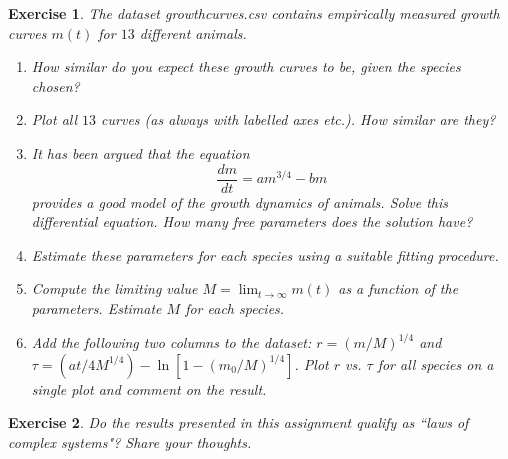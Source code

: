 \documentclass[english, 11pt]{article}
\newtheorem{Ex}{Exercise}
\begin{document}
\begin{Ex}
		The dataset growth\textunderscore curves.csv contains empirically measured growth curves $m(t)$ for $13$ different animals.
		\begin{enumerate}
			\item How similar do you expect these growth curves to be, given the species chosen?
			\item Plot all $13$ curves (as always with labelled axes etc.). How similar are they?
			\item It has been argued that the equation $$\frac{dm}{dt}=am^{3/4}-bm$$ provides a good model of the growth dynamics of animals. Solve this differential equation. How many free parameters does the solution have?
			\item Estimate these parameters for each species using a suitable fitting procedure. 
			\item Compute the limiting value $M=\lim_{t\to\infty}m(t)$ as a function of the  parameters. Estimate $M$ for each species. 
			\item Add the following two columns to the dataset: $r=(m/M)^{1/4}$ and $\tau=(at/4M^{1/4})-\ln[1-(m_0/M)^{1/4}]$. Plot $r$ vs. $\tau$ for all species on a single plot and comment on the result.
		\end{enumerate}
\end{Ex}


\begin{Ex}
Do the results presented in this assignment qualify as ``laws of complex systems"? Share your thoughts.  	
\end{Ex}



  
\end{document}
